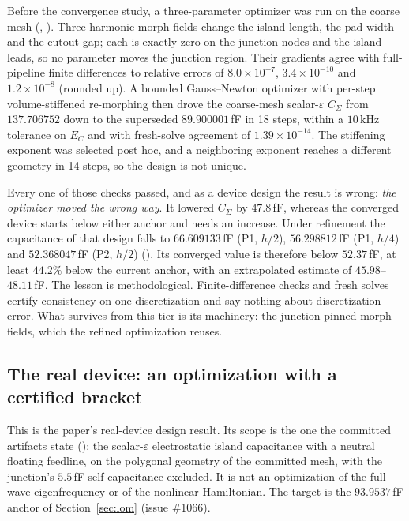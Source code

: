 \documentclass{anvil-paper}
\begin{document}
Before the convergence study, a three-parameter optimizer was run on
the coarse mesh
(,
). Three
harmonic morph fields change the island length, the pad width and the
cutout gap; each is exactly zero on the junction nodes and the island
leads, so no parameter moves the junction region. Their gradients agree
with full-pipeline finite differences to relative errors of
$8.0\times10^{-7}$, $3.4\times10^{-10}$ and $1.2\times10^{-8}$ (rounded up). A
bounded Gauss--Newton optimizer with per-step volume-stiffened
re-morphing then drove the coarse-mesh scalar-$\varepsilon$ $C_\Sigma$
from $137.706752$ down to the superseded $89.900001$\,fF in 18 steps, within a
$10$\,kHz tolerance on $E_C$ and with fresh-solve agreement of
$1.39\times10^{-14}$. The stiffening exponent was selected post hoc,
and a neighboring exponent reaches a different geometry in 14 steps, so
the design is not unique.

Every one of those checks passed, and as a device design the result is
wrong: \emph{the optimizer moved the wrong way}. It lowered $C_\Sigma$
by $47.8$\,fF, whereas the converged device starts below either anchor
and needs an increase. Under refinement the capacitance of that design
falls to $66.609133$\,fF (P1, $h/2$), $56.298812$\,fF (P1, $h/4$) and
$52.368047$\,fF (P2, $h/2$)
(). Its
converged value is therefore below $52.37$\,fF, at least $44.2\%$ below
the current anchor, with an extrapolated estimate of $45.98$--$48.11$\,fF. The
lesson is methodological. Finite-difference checks and fresh solves
certify consistency on one discretization and say nothing about
discretization error. What survives from this tier is its machinery:
the junction-pinned morph fields, which the refined optimization
reuses.

\subsection{The real device: an optimization with a certified bracket}
\label{sec:refined}

This is the paper's real-device design result. Its scope is the one the
committed artifacts state
(): the
scalar-$\varepsilon$ electrostatic island capacitance with a neutral
floating feedline, on the polygonal geometry of the committed mesh,
with the junction's $5.5$\,fF self-capacitance excluded. It is not an
optimization of the full-wave eigenfrequency or of the nonlinear
Hamiltonian. The target is the $93.9537$\,fF anchor of
Section~\ref{sec:lom} (issue \#1066).
\end{document}
